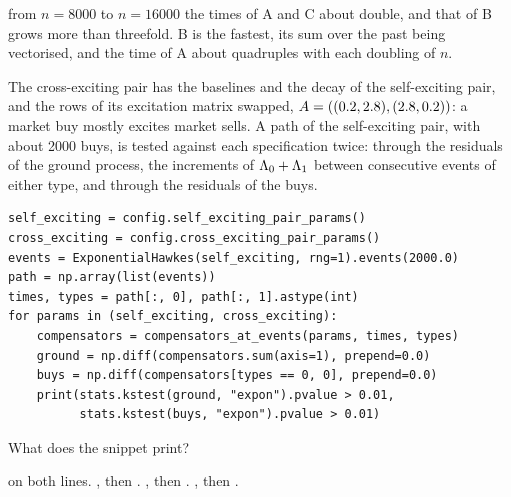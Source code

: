 \begin{question}
\begin{choices}
  from $n = 8000$ to $n = 16000$ the times of A and C about double,
  and that of B grows more than threefold.
 \choice B is the fastest, its sum over the past being vectorised,
  and the time of A about quadruples with each doubling of $n$.
\end{choices}
\end{question}

\begin{question}
\label{question.groundResidualsCannotSeeTheTypes}
The cross-exciting pair has the baselines and the decay of the self-exciting pair,
and the rows of its excitation matrix swapped,
$A = ((0.2, 2.8), (2.8, 0.2))$:
a market buy mostly excites market sells.
A path of the self-exciting pair, with about 2000 buys,
is tested against each specification twice:
through the residuals of the ground process,
the increments of $\Lambda_0 + \Lambda_1$ between consecutive events of either type,
and through the residuals of the buys.
\begin{lstlisting}[caption={The ground process and the buys, under two kernels}, label=listing.groundResidualsRun]
self_exciting = config.self_exciting_pair_params()
cross_exciting = config.cross_exciting_pair_params()
events = ExponentialHawkes(self_exciting, rng=1).events(2000.0)
path = np.array(list(events))
times, types = path[:, 0], path[:, 1].astype(int)
for params in (self_exciting, cross_exciting):
    compensators = compensators_at_events(params, times, types)
    ground = np.diff(compensators.sum(axis=1), prepend=0.0)
    buys = np.diff(compensators[types == 0, 0], prepend=0.0)
    print(stats.kstest(ground, "expon").pvalue > 0.01,
          stats.kstest(buys, "expon").pvalue > 0.01)
\end{lstlisting}
What does the snippet print?
\begin{choices}
 \choice {} on both lines.
 \correctchoice {}, then .
 \choice {}, then .
 \choice {}, then .
\end{choices}
\end{question}

